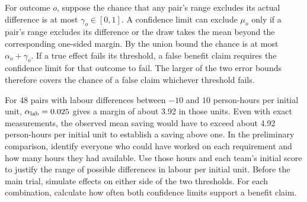 For outcome $o$, suppose the chance that any pair's range excludes its actual difference is at most $\gamma_o\in[0,1]$. A confidence limit can exclude $\mu_o$ only if a pair's range excludes its difference or the draw takes the mean beyond the corresponding one-sided margin. By the union bound the chance is at most $\alpha_o+\gamma_o$. If a true effect fails its threshold, a false benefit claim requires the confidence limit for that outcome to fail. The larger of the two error bounds therefore covers the chance of a false claim whichever threshold fails.

For 48 pairs with labour differences between $-10$ and $10$ person-hours per initial unit, $\alpha_{\rm lab}=0.025$ gives a margin of about 3.92 in those units. Even with exact measurements, the observed mean saving would have to exceed about 4.92 person-hours per initial unit to establish a saving above one. In the preliminary comparison, identify everyone who could have worked on each requirement and how many hours they had available. Use those hours and each team's initial score to justify the range of possible differences in labour per initial unit. Before the main trial, simulate effects on either side of the two thresholds. For each combination, calculate how often both confidence limits support a benefit claim.

